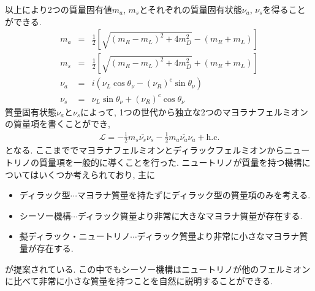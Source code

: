 以上により2つの質量固有値$m_a$, $m_s$とそれぞれの質量固有状態$\nu_a$, $\nu_s$を得ることができる.
\begin{eqnarray}
  m_a &=& \frac{1}{2}\left[ \sqrt{(m_R - m_L)^2 + 4m_D^2} - (m_R+m_L)\right]\nonumber\\
  m_s &=& \frac{1}{2}\left[ \sqrt{(m_R - m_L)^2 + 4m_D^2} + (m_R+m_L)\right]\nonumber\\
  \nu_a &=& i\left(\nu_L\cos\theta_\nu - (\nu_R)^c\sin\theta_\nu\right)\nonumber\\
  \nu_s &=& \nu_L\sin\theta_\nu + (\nu_R)^c\cos\theta_\nu\nonumber
\end{eqnarray}
質量固有状態$\nu_a$と$\nu_s$によって, 1つの世代から独立な2つのマヨラナフェルミオンの質量項を書くことができ,
\begin{eqnarray}
  \mathcal{L} = -\frac{1}{2}m_s\bar{\nu_s}\nu_s -\frac{1}{2}m_a\bar{\nu_a}{\nu_a} + \mathrm{h.c.}
\end{eqnarray}
となる.
ここまででマヨラナフェルミオンとディラックフェルミオンからニュートリノの質量項を一般的に導くことを行った.
ニュートリノが質量を持つ機構についてはいくつか考えられており, 主に
\begin{itemize}
  \item ディラック型$\cdots$マヨラナ質量を持たずにディラック型の質量項のみを考える.
  \item シーソー機構$\cdots$ディラック質量より非常に大きなマヨラナ質量が存在する.
  \item 擬ディラック・ニュートリノ$\cdots$ディラック質量より非常に小さなマヨラナ質量が存在する.
\end{itemize}
が提案されている.
この中でもシーソー機構はニュートリノが他のフェルミオンに比べて非常に小さな質量を持つことを自然に説明することができる.
